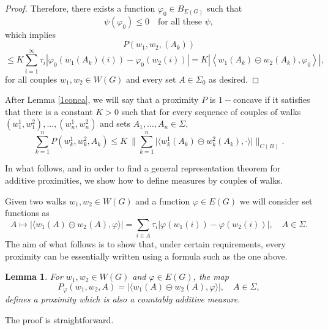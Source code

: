 \documentclass[preprint,12pt]{elsarticle}
\newtheorem{lemma}[theorem]{Lemma}
\begin{document}
\begin{proof}
Therefore, there exists a function $\varphi_0 \in B_{E(G)}$ such that
$$
\psi(\varphi_0) \le 0 \quad \text{for all these } \psi,
$$
which implies
$$
P(w_1, w_2,(A_k)) 
$$
$$\le K \sum_{i=1}^\infty \tau_i \left| \varphi_0(w_1(A_k)(i)) - \varphi_0(w_2(i)) \right|
= K \left| \left\langle w_1(A_k) \circleddash w_2(A_k), \varphi_0 \right\rangle \right|,
$$
for all couples $w_1, w_2 \in W(G)$ and every set $A \in \Sigma_0$ as desired.
\end{proof}

After Lemma \ref{1conca}, we will say that 
a proximity $P$ is $1-$concave if it  satisfies  that there is a constant $K>0$ such that for every sequence of couples of walks $(w^1_1,w^2_1), ..., (w^1_n, w^2_n)$ and sets $A_1,...,A_n \in \Sigma,$
$$
\sum_{k=1}^n P(w^1_k,w^2_k, A_k) \le K \ \Big\|
 \sum_{k=1}^n \big| \langle w^1_k(A_k) \circleddash w^2_k(A_k), \cdot \rangle \big| \Big\|_{C(B)}.
$$


In what follows, and in order to find a general representation theorem for additive proximities, we show how to define measures by couples of walks.





Given two walks $w_1,w_2 \in W(G)$ and a function $\varphi \in E(G)$ we will consider set functions as
$$
A \mapsto \big|\langle w_1(A) \circleddash w_2(A), \varphi \rangle \big|
=
\sum_{i \in A} \tau_i|\varphi(w_1(i))- \varphi(w_2(i))| 
, \quad A \in \Sigma.
$$
The aim of what follows is to show that, under certain requirements, every proximity can be essentially written using a formula such as the one above.

\begin{lemma} \label{stdmeasure}
For $w_1, w_2 \in W(G)$ and $\varphi \in E(G)$, the map
$$
P_\varphi(w_1,w_2, A) = |\langle w_1(A) \circleddash w_2(A), \varphi \rangle|, \quad A \in \Sigma,
$$
defines a proximity which
is also a countably additive measure. 
\end{lemma}
The proof is straightforward.
\end{document}
